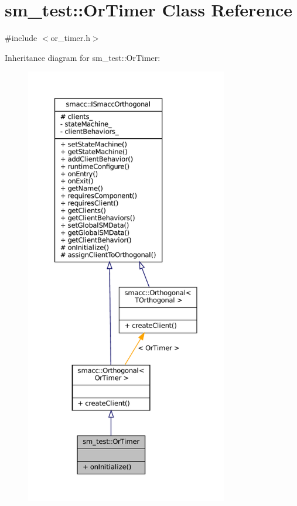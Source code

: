 \hypertarget{classsm__test_1_1OrTimer}{}\section{sm\+\_\+test\+:\+:Or\+Timer Class Reference}
\label{classsm__test_1_1OrTimer}


{\ttfamily \#include $<$or\+\_\+timer.\+h$>$}



Inheritance diagram for sm\+\_\+test\+:\+:Or\+Timer\+:
\nopagebreak
\begin{figure}[H]
\begin{center}
\leavevmode
\includegraphics[height=550pt]{classsm__test_1_1OrTimer__inherit__graph}
\end{center}
\end{figure}


